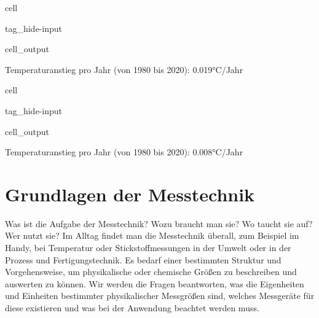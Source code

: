 \documentclass[letterpaper,10pt,english]{jupyterBook}
\begin{document}
\begin{sphinxuseclass}{cell}
\begin{sphinxuseclass}{tag_hide-input}\begin{sphinxVerbatimOutput}

\begin{sphinxuseclass}{cell_output}
\begin{sphinxVerbatim}[commandchars=\\\{\}]
Temperaturanstieg pro Jahr (von 1980 bis 2020): 0.019°C/Jahr
\end{sphinxVerbatim}

\noindent{}

\end{sphinxuseclass}\end{sphinxVerbatimOutput}

\end{sphinxuseclass}
\end{sphinxuseclass}
\begin{sphinxuseclass}{cell}
\begin{sphinxuseclass}{tag_hide-input}\begin{sphinxVerbatimOutput}

\begin{sphinxuseclass}{cell_output}
\begin{sphinxVerbatim}[commandchars=\\\{\}]
Temperaturanstieg pro Jahr (von 1980 bis 2020): 0.008°C/Jahr
\end{sphinxVerbatim}

\noindent{}

\end{sphinxuseclass}\end{sphinxVerbatimOutput}

\end{sphinxuseclass}
\end{sphinxuseclass}
\sphinxstepscope


\section{Grundlagen der Messtechnik}
\label{\detokenize{content/0_Basics:grundlagen-der-messtechnik}}\label{\detokenize{content/0_Basics::doc}}
\sphinxAtStartPar
Was ist die Aufgabe der Messtechnik? Wozu braucht man sie? Wo taucht sie auf? Wer nutzt sie?
Im Alltag findet man die Messtechnik überall, zum Beispiel im Handy, bei Temperatur\sphinxhyphen{} oder Stickstoffmessungen in der Umwelt oder in der Prozess\sphinxhyphen{} und Fertigungstechnik. Es bedarf einer bestimmten Struktur und Vorgehensweise, um physikalische oder chemische Größen zu beschreiben und auswerten zu können.
Wir werden die Fragen beantworten, was die Eigenheiten und Einheiten bestimmter physikalischer Messgrößen sind, welches Messgeräte für diese existieren und was bei der Anwendung beachtet werden muss.
\end{document}

